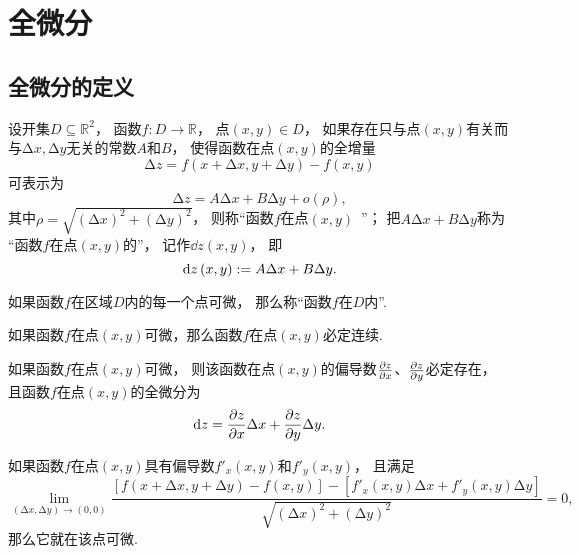 \section{全微分}
\subsection{全微分的定义}
\begin{definition}
设开集\(D \subseteq \mathbb{R}^2\)，
函数\(f\colon D\to\mathbb{R}\)，
点\((x,y) \in D\)，
如果存在只与点\((x,y)\)有关而与\(\increment x,\increment y\)无关的常数\(A\)和\(B\)，
使得函数在点\((x,y)\)的全增量\[
	\increment z = f(x + \increment x,y + \increment y) - f(x,y)
\]可表示为\[
	\increment z = A \increment x + B \increment y + o(\rho),
\]
其中\(\rho=\sqrt{(\increment x)^2+(\increment y)^2}\)，
则称“函数\(f\)在点\((x,y)\)~”；
把\(A \increment x + B \increment y\)称为
“函数\(f\)在点\((x,y)\)的”，
记作\(\dd{z}(x,y)\)，
即\[
	\dd{z}(x,y)
	:=
	A \Delta x + B \Delta y.
\]
\end{definition}
\begin{definition}
如果函数\(f\)在区域\(D\)内的每一个点可微，
那么称“函数\(f\)在\(D\)内”.
\end{definition}

\begin{theorem}[必要条件1]
如果函数\(f\)在点\((x,y)\)可微，那么函数\(f\)在点\((x,y)\)必定连续.
\end{theorem}

\begin{theorem}[必要条件2]\label{theorem:多元函数微分法.二元函数可微的必要条件}
如果函数\(f\)在点\((x,y)\)可微，
则该函数在点\((x,y)\)的偏导数\(\pdv{z}{x}\)、\(\pdv{z}{y}\)必定存在，
且函数\(f\)在点\((x,y)\)的全微分为\[
	\dd{z} = \pdv{z}{x} \Delta x + \pdv{z}{y} \Delta y.
\]
\end{theorem}

\begin{theorem}
如果函数\(f\)在点\((x,y)\)具有偏导数\(f'_x(x,y)\)和\(f'_y(x,y)\)，
且满足\[
	\lim_{(\increment x,\increment y)\to(0,0)}
	\frac{
		[f(x+\increment x,y+\increment y)-f(x,y)]
		-[f'_x(x,y) \increment x + f'_y(x,y) \increment y]
	}{
		\sqrt{(\increment x)^2+(\increment y)^2}
	} = 0,
\]那么它就在该点可微.
\end{theorem}

